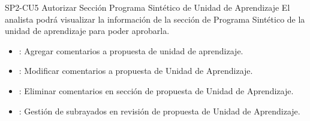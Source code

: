 \begin{UseCase}{SP2-CU5}{ Autorizar Sección Programa Sintético de Unidad de Aprendizaje }{El analista podrá visualizar la información de la sección de Programa Sintético de la unidad de aprendizaje para poder aprobarla.}
{\begin{itemize}
        	\end{itemize}
        }
		{
		\begin{itemize}
			\item {}: Agregar comentarios a propuesta de unidad de aprendizaje.
			\item {}: Modificar comentarios a propuesta de Unidad de Aprendizaje.
			\item {}: Eliminar comentarios en sección de propuesta de Unidad de Aprendizaje.
			\item {}: Gestión de subrayados en revisión de propuesta de Unidad de Aprendizaje.
		\end{itemize}
		}
\end{UseCase}


